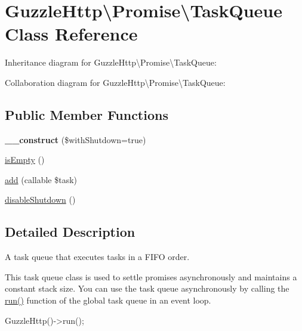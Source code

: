 \hypertarget{classGuzzleHttp_1_1Promise_1_1TaskQueue}{}\section{Guzzle\+Http\textbackslash{}Promise\textbackslash{}Task\+Queue Class Reference}
\label{classGuzzleHttp_1_1Promise_1_1TaskQueue}


Inheritance diagram for Guzzle\+Http\textbackslash{}Promise\textbackslash{}Task\+Queue\+:


Collaboration diagram for Guzzle\+Http\textbackslash{}Promise\textbackslash{}Task\+Queue\+:
\subsection*{Public Member Functions}
\begin{DoxyCompactItemize}
\item 
\mbox{\label{classGuzzleHttp_1_1Promise_1_1TaskQueue_adfdc71b4d57019a887087cbc4a9446be}} 
{\bfseries \+\_\+\+\_\+construct} (\$with\+Shutdown=true)
\item 
\hyperlink{classGuzzleHttp_1_1Promise_1_1TaskQueue_a4589829e74091b66d7b6aba06e6d38b8}{is\+Empty} ()
\item 
\hyperlink{classGuzzleHttp_1_1Promise_1_1TaskQueue_a6f14a0f54a9033aabd6e49b20e3749b3}{add} (callable \$task)
\item 
\hyperlink{classGuzzleHttp_1_1Promise_1_1TaskQueue_a372840aa53b002273396f7f831342155}{disable\+Shutdown} ()
\end{DoxyCompactItemize}


\subsection{Detailed Description}
A task queue that executes tasks in a F\+I\+FO order.

This task queue class is used to settle promises asynchronously and maintains a constant stack size. You can use the task queue asynchronously by calling the {\ttfamily \hyperlink{interfaceGuzzleHttp_1_1Promise_1_1TaskQueueInterface_a237b20becf9d317b6092a8bc04ab27fc}{run()}} function of the global task queue in an event loop. \begin{DoxyVerb}GuzzleHttp\Promise\queue()->run();\end{DoxyVerb}
 

